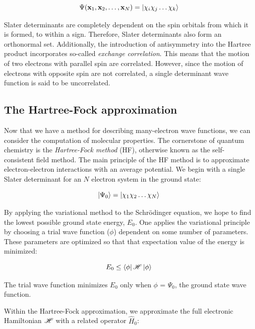 \begin{equation}
  \Psi(\mathbf{x}_1,\mathbf{x}_2,\dots,\mathbf{x}_N) = \ket{\chi_i\chi_j\dots\chi_k}
\end{equation}

Slater determinants are completely dependent on the spin orbitals from which it
is formed, to within a sign. Therefore, Slater determinants also form an
orthonormal set. Additionally, the introduction of antisymmetry into the
Hartree product incorporates so-called \emph{exchange correlation}. This means
that the motion of two electrons with parallel spin are correlated. However,
since the motion of electrons with opposite spin are not correlated, a single
determinant wave function is said to be uncorrelated.

\subsection{The Hartree-Fock approximation}

Now that we have a method for describing many-electron wave functions, we can
consider the computation of molecular properties. The cornerstone of quantum
chemistry is the \emph{Hartree-Fock method} (HF), otherwise known as the
self-consistent field method. The main principle of the HF method is to
approximate electron-electron interactions with an average potential. We begin
with a single Slater determinant for an $N$ electron system in the ground
state:

\begin{equation}
\ket{\Psi_0} = \ket{\chi_1\chi_2\dots\chi_N}
\end{equation}

\noindent By applying the variational method to the Schr{\"o}dinger equation,
we hope to find the lowest possible ground state energy, $E_0$. One applies the
variational principle by choosing a trial wave function ($\phi$) dependent on
some number of parameters. These parameters are optimized so that that
expectation value of the energy is minimized:

\begin{equation}
  E_0 \leq \bra{\phi}\mathscr{H}\ket{\phi}
\end{equation}

\noindent The trial wave function minimizes $E_0$ only when $\phi$ = $\Psi_0$,
the ground state wave function.

Within the Hartree-Fock approximation, we approximate the full electronic
Hamiltonian $\mathscr{H}$ with a related operator $\hat{H}_0$:

